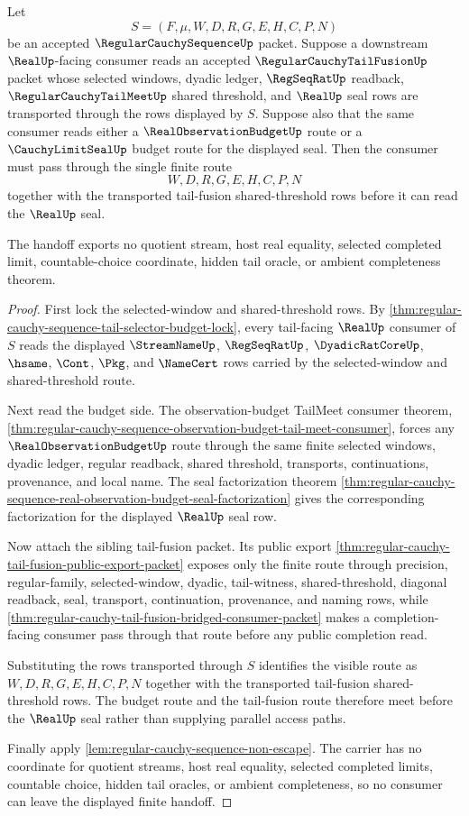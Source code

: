 \begin{theorem}
\label{thm:regular-cauchy-sequence-tail-fusion-budget-handoff}
Let
$$
S=(F,\mu,W,D,R,G,E,H,C,P,N)
$$
be an accepted $\RegularCauchySequenceUp$ packet. Suppose a downstream
$\RealUp$-facing consumer reads an accepted $\RegularCauchyTailFusionUp$
packet whose selected windows, dyadic ledger, $\RegSeqRatUp$ readback,
$\RegularCauchyTailMeetUp$ shared threshold, and $\RealUp$ seal rows are
transported through the rows displayed by $S$. Suppose also that the same
consumer reads either a $\RealObservationBudgetUp$ route or a
$\CauchyLimitSealUp$ budget route for the displayed seal. Then the consumer
must pass through the single finite route
$$
W,D,R,G,E,H,C,P,N
$$
together with the transported tail-fusion shared-threshold rows before it can
read the $\RealUp$ seal.

The handoff exports no quotient stream, host real equality, selected completed
limit, countable-choice coordinate, hidden tail oracle, or ambient completeness
theorem.
\end{theorem}
\begin{proof}
First lock the selected-window and shared-threshold rows. By
\autoref{thm:regular-cauchy-sequence-tail-selector-budget-lock}, every
tail-facing $\RealUp$ consumer of $S$ reads the displayed $\StreamNameUp$,
$\RegSeqRatUp$, $\DyadicRatCoreUp$, $\hsame$, $\Cont$, $\Pkg$, and
$\NameCert$ rows carried by the selected-window and shared-threshold route.

Next read the budget side. The observation-budget TailMeet consumer theorem,
\autoref{thm:regular-cauchy-sequence-observation-budget-tail-meet-consumer},
forces any $\RealObservationBudgetUp$ route through the same finite selected
windows, dyadic ledger, regular readback, shared threshold, transports,
continuations, provenance, and local name. The seal factorization theorem
\autoref{thm:regular-cauchy-sequence-real-observation-budget-seal-factorization}
gives the corresponding factorization for the displayed $\RealUp$ seal row.

Now attach the sibling tail-fusion packet. Its public export
\autoref{thm:regular-cauchy-tail-fusion-public-export-packet} exposes only the
finite route through precision, regular-family, selected-window, dyadic,
tail-witness, shared-threshold, diagonal readback, seal, transport,
continuation, provenance, and naming rows, while
\autoref{thm:regular-cauchy-tail-fusion-bridged-consumer-packet} makes a
completion-facing consumer pass through that route before any public
completion read.

Substituting the rows transported through $S$ identifies the visible route as
$W,D,R,G,E,H,C,P,N$ together with the transported tail-fusion shared-threshold
rows. The budget route and the tail-fusion route therefore meet before the
$\RealUp$ seal rather than supplying parallel access paths.

Finally apply \autoref{lem:regular-cauchy-sequence-non-escape}. The carrier
has no coordinate for quotient streams, host real equality, selected completed
limits, countable choice, hidden tail oracles, or ambient completeness, so no
consumer can leave the displayed finite handoff.
\end{proof}

